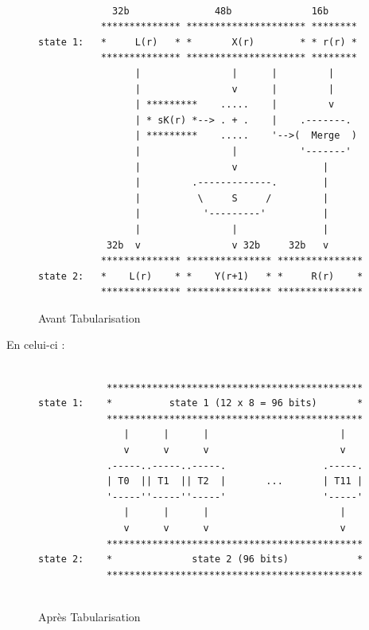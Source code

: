 \documentclass[a4paper,12pt]{article}
\begin{document}
\begin{figure}[h]
\begin{verbatim}
			
             32b               48b              16b
           ************** ********************* ********
state 1:   *     L(r)   * *       X(r)        * * r(r) *
           ************** ********************* ********
                 |                |      |         |
                 |                v      |         |
                 | *********    .....    |         v
                 | * sK(r) *--> . + .    |    .-------.
                 | *********    .....    '-->(  Merge  )
                 |                |           '-------'
                 |                v               |
                 |         .-------------.        |
                 |          \     S     /         |
                 |           '---------'          |
                 |                |               |
            32b  v                v 32b     32b   v
           ************** *************** ***************
state 2:   *    L(r)    * *    Y(r+1)   * *     R(r)    *
           ************** *************** ***************

\end{verbatim}
\caption{Avant Tabularisation}
\label{fig:ascii-box}
\end{figure}		

\clearpage

En celui-ci :

\begin{figure}[h]
\begin{verbatim}

            *********************************************
state 1:    *          state 1 (12 x 8 = 96 bits)       *
            *********************************************
               |      |      |                       |
               v      v      v                       v
            .-----..-----..-----.                 .-----.
            | T0  || T1  || T2  |       ...       | T11 |
            '-----''-----''-----'                 '-----'
               |      |      |                       |
               v      v      v                       v
            *********************************************
state 2:    *              state 2 (96 bits)            *
            *********************************************			
			
\end{verbatim}
\caption{Après Tabularisation}
\label{fig:ascii-box}
\end{figure}		
		
\end{document}
